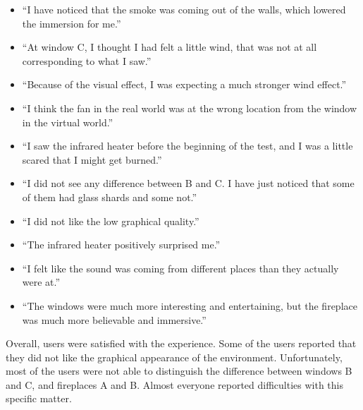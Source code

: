 \begin{itemize}
    \itemsep0em

\item ``I have noticed that the smoke was coming out of the walls, which
lowered the immersion for me.''

\item ``At window C, I thought I had felt a little wind,
that was not at all corresponding to what I saw.''

\item ``Because of the visual effect, I was expecting a much stronger wind
effect.''

\item ``I think the fan in the real world was at the wrong location from the
window in the virtual world.''

\item ``I saw the infrared heater before the beginning of the test, and I was
a little scared that I might get burned.''

\item ``I did not see any difference between B and C. I have just noticed that
some of them had glass shards and some not.''

\item ``I did not like the low graphical quality.''

\item ``The infrared heater positively surprised me.''

\item ``I felt like the sound was coming from different places than they actually
were at.''

\item ``The windows were much more interesting and entertaining, but the fireplace
was much more believable and immersive.''

\end{itemize}


Overall, users were satisfied with the experience. Some of the users reported
that they did not like the graphical appearance of the environment.
Unfortunately, most of the users were not able to distinguish the difference
between windows B and C, and fireplaces A and B. Almost everyone reported
difficulties with this specific matter.